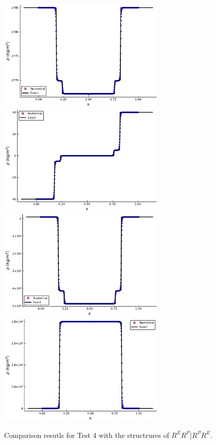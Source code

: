 \documentclass{article}
\numberwithin{equation}{section}
\numberwithin{table}{section}
\begin{document}
\begin{figure}
  \centering

 \includegraphics[width= 8cm] {case3rho.pdf}
  \includegraphics[width= 8cm] {case3u.pdf}
  \includegraphics[width= 8cm] {case3p.pdf}
  \includegraphics[width= 8cm] {case3sxx.pdf}

    \caption{Comparison resutls for Test 4 with the structrures of $R^ER^P|R^PR^E$.  }
  \label{fig:case4}
\end{figure}
\end{document}
